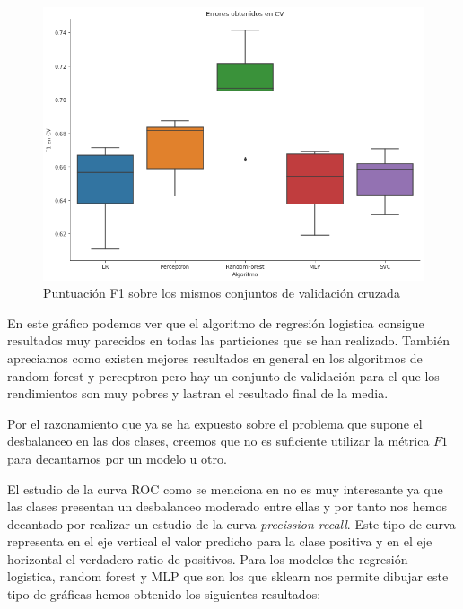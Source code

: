 \documentclass[11pt]{article}
\begin{document}
\begin{figure}[H]
    \centering
    \includegraphics[width=1\textwidth]{images/box_plot}
    \caption{Puntuación F1 sobre los mismos conjuntos de validación cruzada}
\end{figure}

En este gráfico podemos ver que el algoritmo de regresión logistica consigue
resultados muy parecidos en todas las particiones que se han realizado. También
apreciamos como existen mejores resultados en general en los algoritmos de
random forest y perceptron pero hay un conjunto de validación para el que los
rendimientos son muy pobres y lastran el resultado final de la media.

Por el razonamiento que ya se ha expuesto sobre el problema que supone el
desbalanceo en las dos clases, creemos que no es suficiente utilizar la métrica 
$F1$ para decantarnos por un modelo u otro. 

El estudio de la curva ROC como se menciona en \cite{curves} no es muy
interesante ya que las clases presentan un desbalanceo moderado entre ellas y
por tanto nos hemos decantado por realizar un estudio de la curva
\textit{precission-recall}. Este tipo de curva representa en el eje vertical el
valor predicho para la clase positiva y en el eje horizontal el verdadero ratio
de positivos. Para los modelos the regresión logistica, random forest y MLP que
son los que sklearn nos permite dibujar este tipo de gráficas hemos obtenido 
los siguientes resultados:
\end{document}
